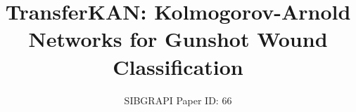 \documentclass[10pt,conference]{IEEEtran}
\newif\iffinal
\newcommand{\cmtid}{66}
\begin{document}
%
\title{TransferKAN: Kolmogorov-Arnold Networks for Gunshot Wound Classification}



\iffinal

\author{
\IEEEauthorblockN{Arthur Silva Carneiro and Pedro Garcia Freitas}
\IEEEauthorblockA{\textit{Department of Computer Science}, \textit{University of Brasília}, Brasília, Brazil \\
}
}



% 

\else
  \author{SIBGRAPI Paper ID: \cmtid \\ }
  \linenumbers
\fi
\end{document}
